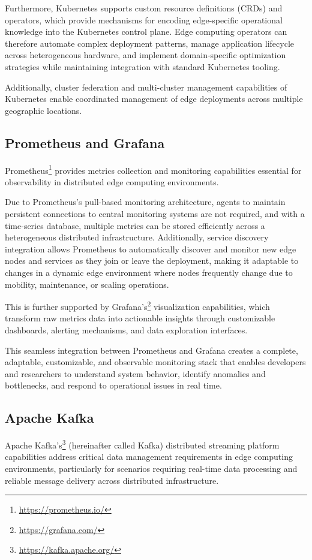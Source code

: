 Furthermore, Kubernetes supports custom resource definitions (CRDs) and operators, which provide mechanisms for encoding edge-specific operational knowledge into the Kubernetes control plane.
Edge computing operators can therefore automate complex deployment patterns, manage application lifecycle across heterogeneous hardware, and implement domain-specific optimization strategies while maintaining integration with standard Kubernetes tooling.

Additionally, cluster federation and multi-cluster management capabilities of Kubernetes enable coordinated management of edge deployments across multiple geographic locations.

\subsection{Prometheus and Grafana}
Prometheus\footnote{\url{https://prometheus.io/}} provides metrics collection and monitoring capabilities essential for observability in distributed edge computing environments.

Due to Prometheus's pull-based monitoring architecture, agents to maintain persistent connections to central monitoring systems are not required, and with a time-series database, multiple metrics can be stored efficiently across a heterogeneous distributed infrastructure.
Additionally, service discovery integration allows Prometheus to automatically discover and monitor new edge nodes and services as they join or leave the deployment, making it adaptable to changes in a dynamic edge environment where nodes frequently change due to mobility, maintenance, or scaling operations.

This is further supported by Grafana's\footnote{\url{https://grafana.com/}} visualization capabilities, which transform raw metrics data into actionable insights through customizable dashboards, alerting mechanisms, and data exploration interfaces.

This seamless integration between Prometheus and Grafana creates a complete, adaptable, customizable, and observable monitoring stack that enables developers and researchers to understand system behavior, identify anomalies and bottlenecks, and respond to operational issues in real time.

\subsection{Apache Kafka}
Apache Kafka's\footnote{\url{https://kafka.apache.org/}} (hereinafter called Kafka) distributed streaming platform capabilities address critical data management requirements in edge computing environments, particularly for scenarios requiring real-time data processing and reliable message delivery across distributed infrastructure.

